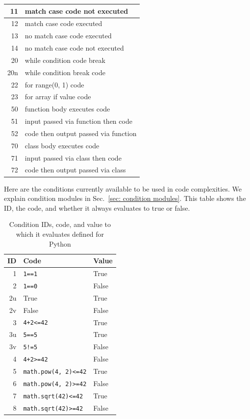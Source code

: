 \begin{appendices}
\begin{table}[H]
\begin{tabular}{|r|l|}
 11 & match case code not executed \\
\hline
 12 & match case code executed \\
\hline
 13 & no match case code executed \\
\hline
 14 & no match case code not executed \\
\hline

20 & while condition code break \\
\hline
20n & while condition break code \\
\hline
22 & for range(0, 1) code \\
\hline
23 & for array if value code \\
\hline

50 & function body executes code \\
\hline
51 & input passed via function then code \\
\hline
52 & code then output passed via function \\
\hline

70 & class body executes code \\
\hline
71 & input passed via class then code \\
\hline
72 & code then output passed via class \\
\hline
\end{tabular}
\label{tab:complexity IDs for Python}
\end{table}

\newpage

Here are the conditions currently available to be used in code complexities.
We explain condition modules in Sec.~\ref{sec: condition modules}.
This table shows the ID, the code, and whether it
always evaluates to true or false.

\begin{table}[H]
\centering
\caption{Condition IDs, code, and value to which it evaluates defined for
  Python}
\begin{tabular}{|r|l|l|}
\hline
\textbf{ID} & \textbf{Code} & \textbf{Value} \\
\hline
1 & \verb|1==1| & True \\
\hline
2 & \verb|1==0| & False \\
\hline
2u & True & True \\
\hline
2v & False & False \\
\hline
3 & \verb|4+2<=42| & True \\
\hline
3u & \verb|5==5| & True \\
\hline
3v & \verb|5!=5| & False \\
\hline
4 & \verb|4+2>=42| & False \\
\hline
5 & \verb|math.pow(4, 2)<=42| & True \\
\hline
6 & \verb|math.pow(4, 2)>=42| & False \\
\hline
7 & \verb|math.sqrt(42)<=42| & True \\
\hline
8 & \verb|math.sqrt(42)>=42| & False \\
\hline
\end{tabular}
\label{tab:condition IDs for Python}
\end{table}



\end{appendices}
